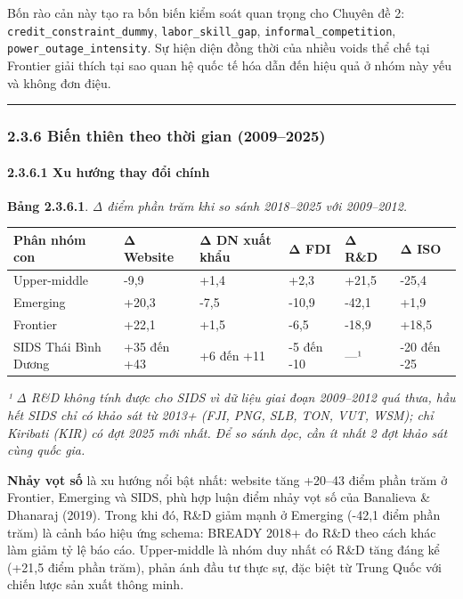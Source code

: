 \documentclass[12pt,a4paper]{article}
\begin{document}
Bốn rào cản này tạo ra bốn biến kiểm soát quan trọng cho Chuyên đề 2:
\texttt{credit\_constraint\_dummy}, \texttt{labor\_skill\_gap},
\texttt{informal\_competition}, \texttt{power\_outage\_intensity}. Sự
hiện diện đồng thời của nhiều voids thể chế tại Frontier giải thích tại
sao quan hệ quốc tế hóa dẫn đến hiệu quả ở nhóm này yếu và không đơn
điệu.

\begin{center}\rule{0.5\linewidth}{0.5pt}\end{center}

\hypertarget{236-biux1ebfn-thiuxean-theo-thux1eddi-gian-20092025}{%
\subsubsection{2.3.6 Biến thiên theo thời gian
(2009--2025)}\label{236-biux1ebfn-thiuxean-theo-thux1eddi-gian-20092025}}

\hypertarget{2361-xu-hux1b0ux1edbng-thay-ux111ux1ed5i-chuxednh}{%
\paragraph{2.3.6.1 Xu hướng thay đổi
chính}\label{2361-xu-hux1b0ux1edbng-thay-ux111ux1ed5i-chuxednh}}

\textbf{Bảng 2.3.6.1}. \emph{Δ điểm phần trăm khi so sánh 2018--2025 với
2009--2012.}

\begin{longtable}[]{@{}llllll@{}}
\toprule\noalign{}
Phân nhóm con & Δ Website & Δ DN xuất khẩu & Δ FDI & Δ R\&D & Δ ISO \\
\midrule\noalign{}
\endhead
\bottomrule\noalign{}
\endlastfoot
Upper-middle & -9,9 & +1,4 & +2,3 & +21,5 & -25,4 \\
Emerging & +20,3 & -7,5 & -10,9 & -42,1 & +1,9 \\
Frontier & +22,1 & +1,5 & -6,5 & -18,9 & +18,5 \\
SIDS Thái Bình Dương & +35 đến +43 & +6 đến +11 & -5 đến -10 & ---¹ &
-20 đến -25 \\
\end{longtable}

\emph{¹ Δ R\&D không tính được cho SIDS vì dữ liệu giai đoạn 2009--2012
quá thưa, hầu hết SIDS chỉ có khảo sát từ 2013+ (FJI, PNG, SLB, TON,
VUT, WSM); chỉ Kiribati (KIR) có đợt 2025 mới nhất. Để so sánh dọc, cần
ít nhất 2 đợt khảo sát cùng quốc gia.}

\textbf{Nhảy vọt số} là xu hướng nổi bật nhất: website tăng +20--43 điểm
phần trăm ở Frontier, Emerging và SIDS, phù hợp luận điểm nhảy vọt số
của Banalieva \& Dhanaraj (2019). Trong khi đó, R\&D giảm mạnh ở
Emerging (-42,1 điểm phần trăm) là cảnh báo hiệu ứng schema: BREADY
2018+ đo R\&D theo cách khác làm giảm tỷ lệ báo cáo. Upper-middle là
nhóm duy nhất có R\&D tăng đáng kể (+21,5 điểm phần trăm), phản ánh đầu
tư thực sự, đặc biệt từ Trung Quốc với chiến lược sản xuất thông minh.
\end{document}
